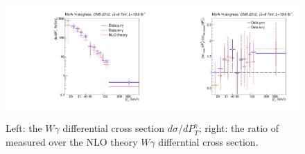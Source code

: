 \begin{figure}[htb]
  \begin{center}
   \includegraphics[width=0.5\textwidth]{../figs/figs_v11/ChannelsMERGED_WGamma/CrossSection/compareCSWGamma.pdf}\includegraphics[width=0.5\textwidth]{../figs/figs_v11/ChannelsMERGED_WGamma/CrossSection/compareCSratioTheoryWGamma.pdf}
  \caption{Left: the $W\gamma$ differential cross section $d\sigma/dP_T^{\gamma}$; right: the ratio of measured over the NLO theory $W\gamma$ differntial cross section. }
  \label{fig:CS_Wg}
 \end{center}
\end{figure}

